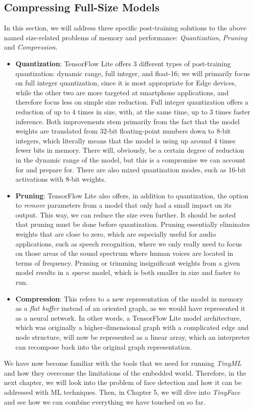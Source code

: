 \subsection{Compressing Full-Size Models}
In this section, we will address three specific post-training solutions to the above named size-related problems of memory and performance: \textit{Quantization}, \textit{Pruning} and \textit{Compression}. \par
\begin{itemize}
    \item \textbf{Quantization}: TensorFlow Lite offers 3 different types of post-training quantization: dynamic range, full integer, and float-16; we will primarily focus on full integer quantization, since it is most appropriate for Edge devices, while the other two are more targeted at smartphone applications, and therefore focus less on simple size reduction. Full integer quantization offers a reduction of up to 4 times in size, with, at the same time, up to 3 times faster inference. Both improvements stem primarily from the fact that the model weights are translated from 32-bit floating-point numbers down to 8-bit integers, which literally means that the model is using up around 4 times fewer bits in memory.  \cite{tflite_quantization} There will, obviously, be a certain degree of reduction in the dynamic range of the model, but this is a compromise we can account for and prepare for. There are also mixed quantization modes, such as 16-bit activations with 8-bit weights.
    \item \textbf{Pruning}: TensorFlow Lite also offers, in addition to quantization, the option to \textit{remove} parameters from a model that only had a small impact on its output. This way, we can reduce the size even further. It should be noted that pruning must be done before quantization. Pruning essentially eliminates weights that are close to zero, which are especially useful for audio applications, such as speech recognition, where we only really need to focus on those areas of the sound spectrum where human voices are located in terms of frequency. Pruning or trimming insignificant weights from a given model results in a \textit{sparse} model, which is both smaller in size and faster to run. \cite{tflite_pruning}
    \item \textbf{Compression}: This refers to a new representation of the model in memory as a \textit{flat buffer} instead of an oriented graph, as we would have represented it as a neural network. In other words, a TensorFlow Lite model architecture, which was originally a higher-dimensional graph with a complicated edge and node structure, will now be represented as a linear array, which an interpreter can recompose back into the original graph representation. \cite{google_prot_buf}
\end{itemize}

\newpage
We have now become familiar with the tools that we need for running \textit{TinyML} and how they overcome the limitations of the embedded world. Therefore, in the next chapter, we will look into the problem of face detection and how it can be addressed with ML techniques. Then, in Chapter 5, we will dive into \textit{TinyFace} and see how we can combine everything we have touched on so far.
